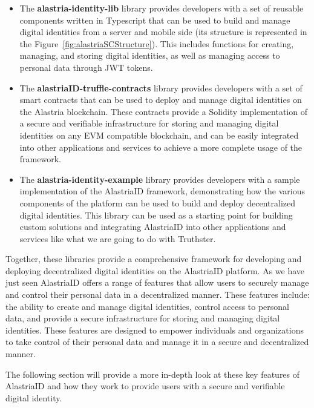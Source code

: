 \documentclass[target=mst,aauheader=]{thud}
\begin{document}
\begin{itemize}

    \item The \textbf{alastria-identity-lib\cite{alastriaIdentityLib}} library provides developers with a set of reusable components written in Typescript that can be used to build and manage digital identities from a server and mobile side (its structure is represented in the Figure~\ref{fig:alastriaSCStructure}). This includes functions for creating, managing, and storing digital identities, as well as managing access to personal data through JWT tokens.
    \item The \textbf{alastriaID-truffle-contracts\cite{alastriaSmartContracts}} library provides developers with a set of smart contracts that can be used to deploy and manage digital identities on the Alastria blockchain. These contracts provide a Solidity implementation of a secure and verifiable infrastructure for storing and managing digital identities on any EVM compatible blockchain, and can be easily integrated into other applications and services to achieve a more complete usage of the framework.
    \item The \textbf{alastria-identity-example\cite{alastriaIdentityExample}} library provides developers with a sample implementation of the AlastriaID framework, demonstrating how the various components of the platform can be used to build and deploy decentralized digital identities. This library can be used as a starting point for building custom solutions and integrating AlastriaID into other applications and services like what we are going to do with Truthster.

\end{itemize}

Together, these libraries provide a comprehensive framework for developing and deploying decentralized digital identities on the AlastriaID platform. 
As we have just seen AlastriaID offers a range of features that allow users to securely manage and control their personal data in a decentralized manner. These features include: the ability to create and manage digital identities, control access to personal data, and provide a secure infrastructure for storing and managing digital identities. These features are designed to empower individuals and organizations to take control of their personal data and manage it in a secure and decentralized manner.\par
The following section will provide a more in-depth look at these key features of AlastriaID and how they work to provide users with a secure and verifiable digital identity.
\end{document}
